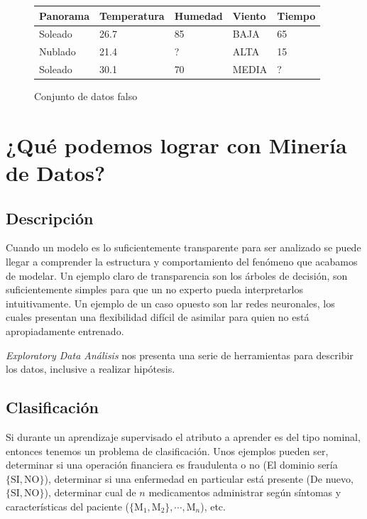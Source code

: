 \documentclass[10pt,a4paper]{article}
\begin{document}
\begin{figure}
  \centering
  \begin{tabular}{| l | l | l | l | l |}
    \hline
    Panorama & Temperatura & Humedad & Viento & Tiempo \\
    \hline
    Soleado  & 26.7        & 85      & BAJA   & 65 \\
    \hline
    Nublado  & 21.4        & ?      & ALTA   & 15 \\
    \hline
    Soleado  & 30.1        & 70      & MEDIA  & ? \\
    \hline
  \end{tabular}
  \caption{Conjunto de datos falso}
  \label{Table1}
\end{figure}

\section{¿Qué podemos lograr con Minería de Datos?}
\subsection{Descripción}
Cuando un modelo es lo suficientemente transparente para ser analizado se puede llegar a comprender la estructura y comportamiento del fenómeno que acabamos de modelar. Un ejemplo claro de transparencia son los árboles de decisión, son suficientemente simples para que un no experto pueda interpretarlos intuitivamente. Un ejemplo de un caso opuesto son lar redes neuronales, los cuales presentan una flexibilidad difícil de asimilar para quien no está apropiadamente entrenado.

\textit{Exploratory Data Análisis} nos presenta una serie de herramientas para describir los datos, inclusive a realizar hipótesis.
\subsection{Clasificación}
Si durante un aprendizaje supervisado el atributo a aprender es del tipo nominal, entonces tenemos un problema de clasificación. Unos ejemplos pueden ser, determinar si una operación financiera es fraudulenta o no (El dominio sería $\{\text{SI}, \text{NO}\}$), determinar si una enfermedad en particular está presente (De nuevo, $\{\text{SI}, \text{NO}\}$), determinar cual de $n$ medicamentos administrar según síntomas y características del paciente ($\{\text{M}_1, \text{M}_2\}, \cdots, \text{M}_n$), etc.
\end{document}
